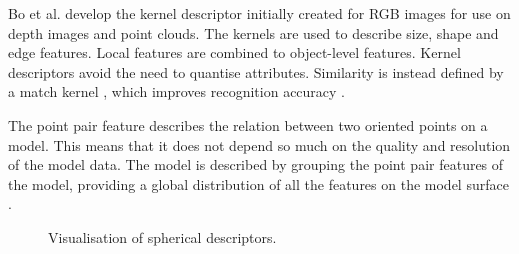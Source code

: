 \documentclass[11pt,a4paper]{kth-mag}
\begin{document}
Bo et al. develop the kernel descriptor initially created for RGB images for use
on depth images and point clouds. The kernels are used to describe size, shape
and edge features. Local features are combined to object-level features. Kernel
descriptors avoid the need to quantise attributes. Similarity is instead defined
by a match kernel \cite{bo2010kernel}, which improves recognition accuracy
\cite{bo2011depth}.

The point pair feature describes the relation between two oriented points on a
model. This means that it does not depend so much on the quality and resolution
of the model data. The model is described by grouping the point pair features of
the model, providing a global distribution of all the features on the model
surface \cite{drost2010model}.

\begin{figure}
  \centering
  \caption{Visualisation of spherical descriptors.}
  \label{fig:descexample}
\end{figure}
\end{document}
